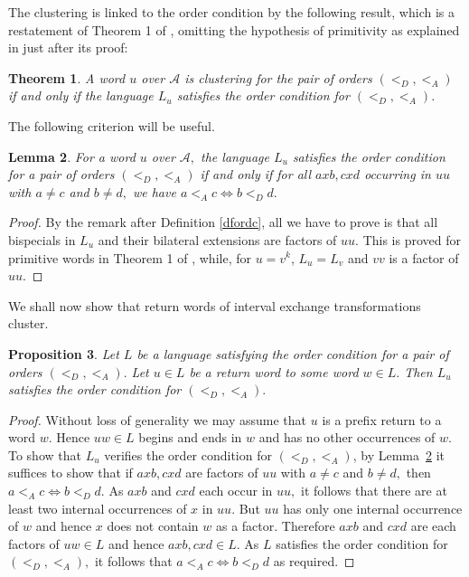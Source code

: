 \documentclass[12pt,a4paper]{amsart}
\newtheorem{theorem}{Theorem}
\newtheorem{lemma}[theorem]{Lemma}
\newtheorem{proposition}[theorem]{Proposition}
\begin{document}
The clustering is linked to the order condition by the following result, which is a restatement of Theorem 1 of \cite{fz5}, omitting the hypothesis of primitivity as explained in \cite{fz5} just after its proof:

 \begin{theorem}\label{t1} \cite{fz5} A  word $u$ over $\mathcal A$ is clustering for the pair of orders  $(<_D,<_A)$ if and only if  the language $L_u$  satisfies the order condition for  $(<_D,<_A)$. \end{theorem}
 
 The following criterion will be useful.
 
  \begin{lemma}\label{useful} For a word $u$ over $\mathcal A,$ the language $L_u$ satisfies the order condition for a pair of orders $(<_D,<_A)$ if and only if  for all $axb,cxd$ occurring in $uu$ with $a\neq c$ and $b\neq d,$ we have $a<_A c\Leftrightarrow b<_D d.$
\end{lemma}

\begin{proof} By the remark after Definition \ref{dfordc},  all we have to prove is that all bispecials in $L_u$ and their bilateral extensions are factors of $uu$. This is proved for primitive words in Theorem 1 of \cite{fz5}, while, for $u=v^k$, $L_u=L_v$ and $vv$ is a factor of $uu$.  \end{proof}


 
 We shall now show that return words of  interval exchange transformations cluster.






 

 

\begin{proposition}\label{fz7}Let $L$ be a language satisfying the order condition for a pair of orders $(<_D, <_A).$  Let $u\in L$ be a return word to some word $w\in L.$ Then $L_u$ satisfies the order condition for $(<_D,<_A).$
\end{proposition}
\begin{proof} Without loss of generality we may assume that $u$ is a prefix return to a word $w.$ Hence $uw\in L$ begins and ends in $w$ and has no other occurrences of $w.$ To show that $L_u$ verifies the  order condition for $(<_D,<_A)$, by Lemma~\ref{useful} it suffices to show that if $axb, cxd$ are factors of $uu$ with $a\neq c$ and $b\neq d,$ then $a<_A c \Leftrightarrow b<_D d.$ As $axb$ and $cxd$ each occur in $uu,$ it follows that there are at least two internal occurrences of $x$ in $uu.$ But  $uu$ has only one internal occurrence of $w$ and hence $x$ does not contain $w$ as a factor. Therefore $axb$ and $cxd$ are each factors of $uw\in L$ and hence $axb, cxd \in L.$ As $L$ satisfies the order condition for $(<_D,<_A),$ it follows that $a<_A c\Leftrightarrow b<_D d$ as required. \end{proof}
\end{document}
